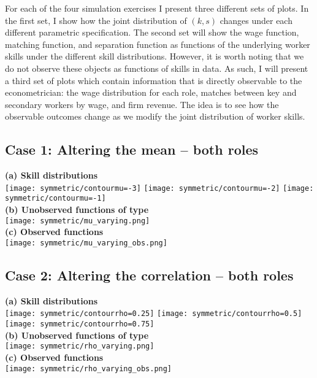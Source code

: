 \documentclass{article}
\begin{document}
	For each of the four simulation exercises I present three different sets of plots. In the first set, I show how the joint distribution of $(k,s)$ changes under each different parametric specification. The second set will show the wage function, matching function, and separation function as functions of the underlying worker skills under the different skill distributions. However, it is worth noting that we do not observe these objects as functions of skills in data. As such, I will present a third set of plots which contain information that is directly observable to the econometrician: the wage distribution for each role, matches between key and secondary workers by wage, and firm revenue. The idea is to see how the observable outcomes change as we modify the joint distribution of worker skills.
	\clearpage
	\subsection*{Case 1: Altering the mean -- both roles}
	\begin{center}
	\textbf{(a) Skill distributions}\\
	
		\texttt{[image: symmetric/contourmu=-3]}\hfill
		\texttt{[image: symmetric/contourmu=-2]}\hfill
		\texttt{[image: symmetric/contourmu=-1]}\\

	\textbf{(b) Unobserved functions of type}\\

		\texttt{[image: symmetric/mu\_varying.png]} \\
		
	\textbf{(c) Observed functions}\\
	
		\texttt{[image: symmetric/mu\_varying\_obs.png]}
	\end{center}
	
		\clearpage
	\subsection*{Case 2: Altering the correlation -- both roles}
	\begin{center}
		\textbf{(a) Skill distributions}\\
		
		\texttt{[image: symmetric/contourrho=0.25]}\hfill
		\texttt{[image: symmetric/contourrho=0.5]}\hfill
		\texttt{[image: symmetric/contourrho=0.75]}\\
		
		\textbf{(b) Unobserved functions of type}\\
		
		\texttt{[image: symmetric/rho\_varying.png]} \\
		
		\textbf{(c) Observed functions}\\
		
		\texttt{[image: symmetric/rho\_varying\_obs.png]}
	\end{center}
	
\end{document}
